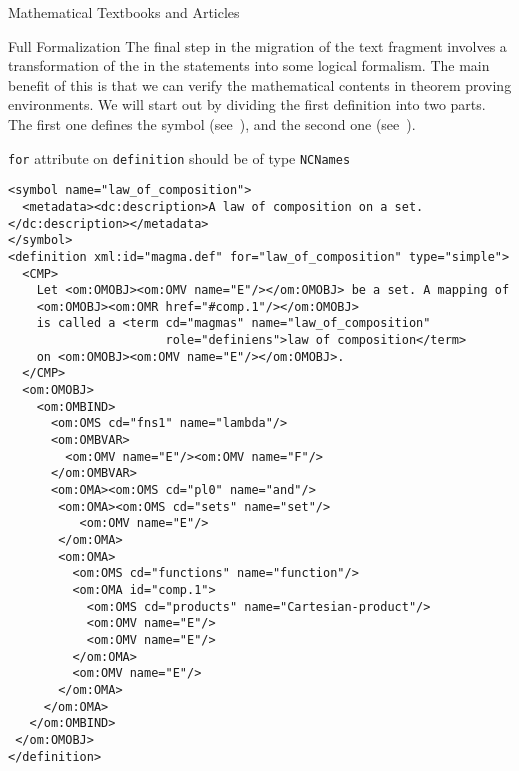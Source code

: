 \begin{tchapter}[id=algebra,short=Textbooks and Articles]{Mathematical Textbooks and Articles}
\begin{tsection}[id=formalization]{Full Formalization}
  The final step in the migration of the text fragment involves a transformation of the
  {} in the statements into some logical formalism. The
  main benefit of this is that we can verify the mathematical contents in theorem proving
  environments.  We will start out by dividing the first definition into two parts. The
  first one defines the symbol {}
  (see~), and the second one {}
  (see~).

\begin{erratum}[reported-by=Michael Kohlhase,date=2009-08-11]{{\texttt{for}} attribute on
    {\texttt{definition}} should be of type {\texttt{NCNames}}}
\begin{lstlisting}[label=lst:law_of_composition-formal,
    caption={The formal definition of a law of composition},
    index={definition,CMP,OMOBJ,OMBIND,OMBVAR,OMS,OMA,OMV}]
<symbol name="law_of_composition">
  <metadata><dc:description>A law of composition on a set.</dc:description></metadata>
</symbol>
<definition xml:id="magma.def" for="law_of_composition" type="simple">
  <CMP> 
    Let <om:OMOBJ><om:OMV name="E"/></om:OMOBJ> be a set. A mapping of 
    <om:OMOBJ><om:OMR href="#comp.1"/></om:OMOBJ> 
    is called a <term cd="magmas" name="law_of_composition" 
                      role="definiens">law of composition</term>
    on <om:OMOBJ><om:OMV name="E"/></om:OMOBJ>.
  </CMP>
  <om:OMOBJ>
    <om:OMBIND>
      <om:OMS cd="fns1" name="lambda"/>
      <om:OMBVAR>
        <om:OMV name="E"/><om:OMV name="F"/>
      </om:OMBVAR>
      <om:OMA><om:OMS cd="pl0" name="and"/>
       <om:OMA><om:OMS cd="sets" name="set"/>
          <om:OMV name="E"/>
       </om:OMA>
       <om:OMA>
         <om:OMS cd="functions" name="function"/>
         <om:OMA id="comp.1">
           <om:OMS cd="products" name="Cartesian-product"/>
           <om:OMV name="E"/>
           <om:OMV name="E"/>
         </om:OMA>
         <om:OMV name="E"/>
       </om:OMA>
     </om:OMA>
   </om:OMBIND>
 </om:OMOBJ>
</definition>
\end{lstlisting}
\end{erratum}


\end{tsection}
\end{tchapter}
